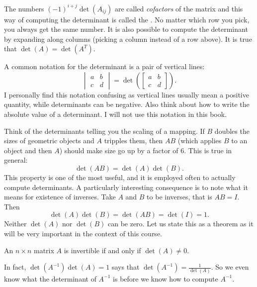 The numbers ${(-1)}^{i+j}\det(A_{ij})$ are called
\emph{cofactors}
of the matrix and
this way of computing the determinant is called the
\emph{}.
No matter which row you pick, you always get the same number.
It is also possible to compute the
determinant by expanding
along columns (picking a column instead of a row above).
It is true that $\det(A) = \det(A^T)$.

A common notation for the determinant is a pair of vertical
lines:
\begin{equation*}
\begin{vmatrix}
a & b \\
c & d
\end{vmatrix}
=
\det \left(
\begin{bmatrix}
a & b \\
c & d
\end{bmatrix}
\right) .
\end{equation*}
I personally find this notation confusing as vertical lines usually
mean a positive quantity, while determinants can be negative.  Also
think about how to write the absolute value of a determinant.  I will not
use this notation in this book.

\medskip

Think of the determinants telling you the scaling of a mapping.  
If $B$ doubles the sizes of geometric objects and $A$ tripples them,
then $AB$ (which applies $B$ to an object and then $A$) should make size
go up by a factor of $6$.  This is true in general:
\begin{equation*}
\det(AB) = \det(A)\det(B) .
\end{equation*}
This property is one of the most useful, and it is employed often to 
actually compute determinants.  A particularly interesting consequence is to
note what it means for existence of inverses.
Take $A$ and $B$ to be inverses, that is $AB=I$.  Then
\begin{equation*}
\det(A)\det(B) = \det(AB) = \det(I) = 1 .
\end{equation*}
Neither $\det(A)$ nor $\det(B)$ can be zero.
Let us state this as a theorem
as it will be very important in the context of this course.

\begin{theorem}
An $n \times n$ matrix $A$ is invertible if and only if $\det (A) \not= 0$.
\end{theorem}

In fact, $\det(A^{-1}) \det(A) = 1$ says that $\det(A^{-1}) =
\frac{1}{\det(A)}$.  So we even know what the determinant of $A^{-1}$ is
before we know how to compute $A^{-1}$.

